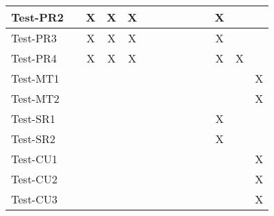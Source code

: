 \documentclass[12pt, titlepage]{article}
\begin{document}
\begin{table}[H]
\begin{adjustwidth}{-0.3in}{-0.5in}
{\begin{tabular}{c|c|c|c|c|c|c|c|c|c|c|c|c|c|}
\multicolumn{1}{|l|}{{Test-PR2}}   &             &        X     &      X       &   X          &             &             &             &             &              &              &                    X       &  &                    \\ \hline
\multicolumn{1}{|l|}{{Test-PR3}}   &             &       X      &      X       &        X     &             &             &             &             &              &              &                    X       &  &                    \\ \hline
\multicolumn{1}{|l|}{{Test-PR4}}   &             &       X      &      X       &        X     &             &             &             &             &              &              &                    X       &  X &                    \\ \hline
\multicolumn{1}{|l|}{{Test-MT1}}   &             &             &             &             &             &             &             &             &              &              &                           &  & X                   \\ \hline
\multicolumn{1}{|l|}{{Test-MT2}}   &             &             &             &             &             &             &             &             &              &              &                           &  &    X                \\ \hline
\multicolumn{1}{|l|}{{Test-SR1}}   &             &             &             &             &             &             &             &             &              &              &                    X       &  &                    \\ \hline
\multicolumn{1}{|l|}{{Test-SR2}}   &             &             &             &             &             &             &             &             &              &              &                     X      &  &                    \\ \hline
\multicolumn{1}{|l|}{{Test-CU1}}   &             &             &             &             &             &             &             &             &              &              &                           &  &    X                \\ \hline
\multicolumn{1}{|l|}{{Test-CU2}}   &             &             &             &             &             &             &             &             &              &              &                           &  &  X                  \\ \hline
\multicolumn{1}{|l|}{{Test-CU3}}   &             &             &             &             &             &             &             &             &              &              &                           &  &  X                  \\ \hline

\end{tabular}}
\end{adjustwidth}
\end{table}
\end{document}
